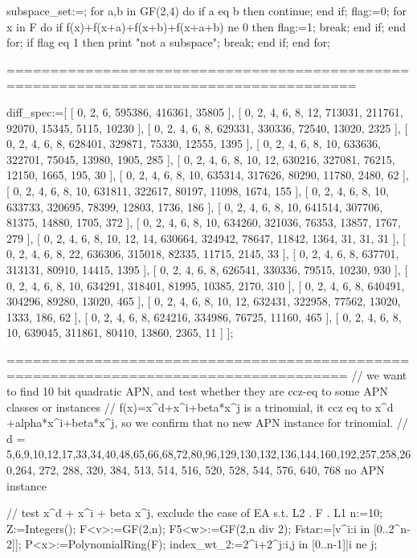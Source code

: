 subspace_set:={};
for a,b in GF(2,4) do
    if a eq b then continue; end if;
    flag:=0;
    for x in F do
        if f(x)+f(x+a)+f(x+b)+f(x+a+b) ne 0 then
            flag:=1;
            break;
        end if;
    end for;
    if flag eq 1 then
        print "not a subspace";
        break;
    end if;
end for;




======================================================================================

diff_spec:=[
    [ 0, 2, 6, 595386, 416361, 35805 ],
    [ 0, 2, 4, 6, 8, 12, 713031, 211761, 92070, 15345, 5115, 10230 ],
    [ 0, 2, 4, 6, 8, 629331, 330336, 72540, 13020, 2325 ],
    [ 0, 2, 4, 6, 8, 628401, 329871, 75330, 12555, 1395 ],
    [ 0, 2, 4, 6, 8, 10, 633636, 322701, 75045, 13980, 1905, 285 ],
    [ 0, 2, 4, 6, 8, 10, 12, 630216, 327081, 76215, 12150, 1665, 195, 30 ],
    [ 0, 2, 4, 6, 8, 10, 635314, 317626, 80290, 11780, 2480, 62 ],
    [ 0, 2, 4, 6, 8, 10, 631811, 322617, 80197, 11098, 1674, 155 ],
    [ 0, 2, 4, 6, 8, 10, 633733, 320695, 78399, 12803, 1736, 186 ],
    [ 0, 2, 4, 6, 8, 10, 641514, 307706, 81375, 14880, 1705, 372 ],
    [ 0, 2, 4, 6, 8, 10, 634260, 321036, 76353, 13857, 1767, 279 ],
    [ 0, 2, 4, 6, 8, 10, 12, 14, 630664, 324942, 78647, 11842, 1364, 31, 31, 31 ],
    [ 0, 2, 4, 6, 8, 22, 636306, 315018, 82335, 11715, 2145, 33 ],
    [ 0, 2, 4, 6, 8, 637701, 313131, 80910, 14415, 1395 ],
    [ 0, 2, 4, 6, 8, 626541, 330336, 79515, 10230, 930 ],
    [ 0, 2, 4, 6, 8, 10, 634291, 318401, 81995, 10385, 2170, 310 ],
    [ 0, 2, 4, 6, 8, 640491, 304296, 89280, 13020, 465 ],
    [ 0, 2, 4, 6, 8, 10, 12, 632431, 322958, 77562, 13020, 1333, 186, 62 ],
    [ 0, 2, 4, 6, 8, 624216, 334986, 76725, 11160, 465 ],
    [ 0, 2, 4, 6, 8, 10, 639045, 311861, 80410, 13860, 2365, 11 ]
];

=====================================================================================
// we want to find 10 bit quadratic APN, and test whether they are ccz-eq to some APN classes or instances
// f(x)=x^d+x^i+beta*x^j is a trinomial, it ccz eq to x^d +alpha*x^i+beta*x^j, so we confirm that no new APN instance for trinomial.
// d = 5,6,9,10,12,17,33,34,40,48,65,66,68,72,80,96,129,130,132,136,144,160,192,257,258,260,264, 272, 288, 320, 384, 513, 514, 516, 520, 528, 544, 576, 640, 768 no APN instance

// test x^d + x^i + beta x^j, exclude the case of EA s.t. L2 . F . L1
n:=10;
Z:=Integers();
F<v>:=GF(2,n);
F5<w>:=GF(2,n div 2);
Fstar:=[v^i:i in [0..2^n-2]];
P<x>:=PolynomialRing(F);
index_wt_2:={2^i+2^j:i,j in [0..n-1]|i ne j};

